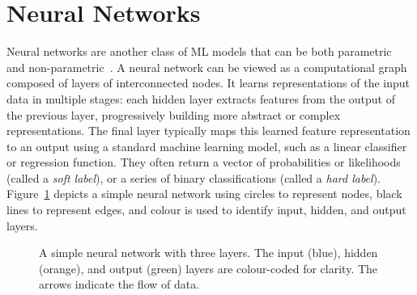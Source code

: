 \section{Neural Networks}
Neural networks are another class of ML models that can be both parametric~\cite{parametric_neural_network} and non-parametric~\cite{non_parametric_neural_network}. 
A neural network can be viewed as a computational graph composed of layers of interconnected nodes. It learns representations of the input data in multiple stages: each hidden layer extracts features from the output of the previous layer, progressively building more abstract or complex representations. 
The final layer typically maps this learned feature representation to an output using a standard machine learning model, such as a linear classifier or regression function.
They often return a vector of probabilities or likelihoods (called a \textit{soft label}), or a series of binary classifications (called a \textit{hard label}). 
Figure~\ref{fig:neural_network} depicts a simple neural network using circles to represent nodes, black lines to represent edges, and colour is used to identify input, hidden, and output layers. 

\begin{figure}[!ht]
\centering
{}
\caption{A simple neural network with three layers. The input (blue), hidden (orange), and output (green) layers are colour-coded for clarity. The arrows indicate the flow of data.}
\label{fig:neural_network}
\end{figure}

